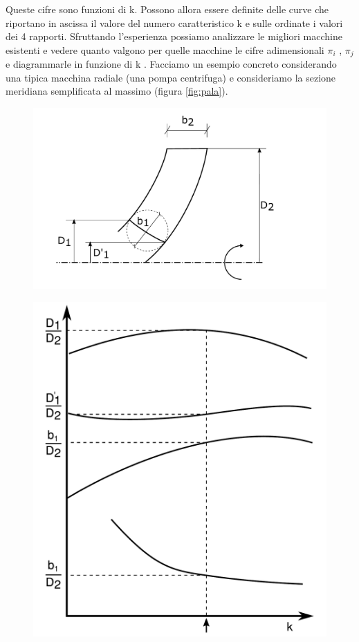 Queste cifre sono funzioni di k. Possono allora essere definite delle curve che riportano in ascissa il valore del numero caratteristico k e sulle ordinate i valori dei 4 rapporti.
Sfruttando l'esperienza possiamo analizzare le migliori macchine esistenti e vedere
quanto valgono per quelle macchine le cifre adimensionali $\pi_i$ , $\pi_j$ e diagrammarle in funzione di k . Facciamo un esempio concreto considerando una tipica macchina radiale (una pompa centrifuga) e consideriamo la sezione meridiana semplificata al massimo (figura \ref{fig:pala}).
\begin{figure}
\centering
\begin{minipage}{.5\textwidth}
  \centering
  \includegraphics[width=.9\linewidth]{fig/pala.pdf}
  \label{fig:pala}
\end{minipage}%
\begin{minipage}{.5\textwidth}
  \centering
  \includegraphics[width=.6\linewidth]{fig/primo_1.pdf}
  \label{fig:primo_1}
\end{minipage}
\end{figure}
